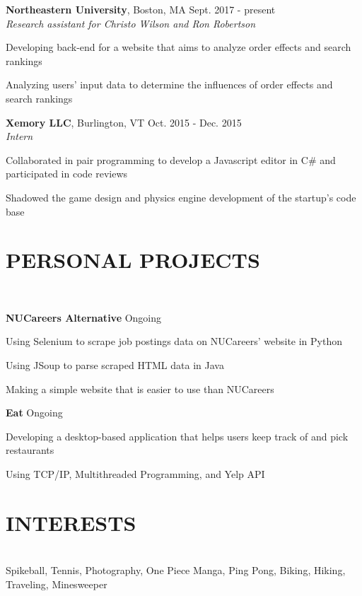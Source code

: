 \documentclass[11pt]{res}
\newcommand{\sectionunderline}{\vspace{-3mm}\hrulefill\\}
\newcommand{\newsect}[1]{\section{\Large \bf #1}}
\begin{document}
\begin{resume}
{{      {\bf Northeastern University}, Boston, MA \hfill Sept. 2017 - present\\
      {\it Research assistant for Christo Wilson and Ron Robertson}
      \begin{itemize}
        {\item Developing back-end for a website that aims to analyze order effects and search rankings}
        {\item Analyzing  users' input data to determine the influences of order effects and search rankings}
      \end{itemize}

      {\bf Xemory LLC}, Burlington, VT \hfill Oct. 2015 - Dec. 2015\\
      {\it Intern}
      \begin{itemize}
        {\item Collaborated in pair programming to develop a Javascript editor in C\# and participated in code reviews}
        {\item Shadowed the game design and physics engine development of the startup's code base}
      \end{itemize}
    }
  }

  \newsect{PERSONAL PROJECTS}{
    \sectionunderline{
      {\bf NUCareers Alternative} \hfill Ongoing
      \begin{itemize}
        {\item Using Selenium to scrape job postings data on NUCareers' website in Python}
        {\item Using JSoup to parse scraped HTML data in Java}
        {\item Making a simple website that is easier to use than NUCareers}
      \end{itemize}

      {\bf Eat} \hfill Ongoing
      \begin{itemize}
        {\item Developing a desktop-based application that helps users keep track of and pick restaurants}
        {\item Using TCP/IP, Multithreaded Programming, and Yelp API}
      \end{itemize}
    }
  }

  \newsect{INTERESTS}{
    \sectionunderline{
      Spikeball, Tennis, Photography, One Piece Manga, Ping Pong, Biking, Hiking, Traveling, Minesweeper
    }
  }
\end{resume}
\end{document}
